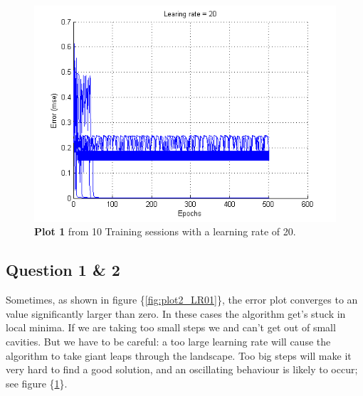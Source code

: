 \documentclass[a4paper]{article}
\begin{document}
\begin{figure}[H] %
	\includegraphics[]{plot2_LR20.png}
	\caption{\label{fig:plot2_LR20}\textbf{Plot 1} from 10 Training sessions with a learning rate of 20.}
\end{figure}
\subsection*{Question 1 \& 2}
Sometimes, as shown in figure \{\ref{fig:plot2_LR01}\}, 
the error plot converges to an value significantly larger than zero.
In these cases the algorithm get's stuck in local minima. If we are taking too 
small steps we and can't get out of small cavities. But we have to be careful: 
a too large learning rate will cause the algorithm to take giant leaps through the landscape. 
Too big steps will make it very hard to find a good solution, and an oscillating 
behaviour is likely to occur; see figure \{\ref{fig:plot2_LR20}\}. 
\end{document}
